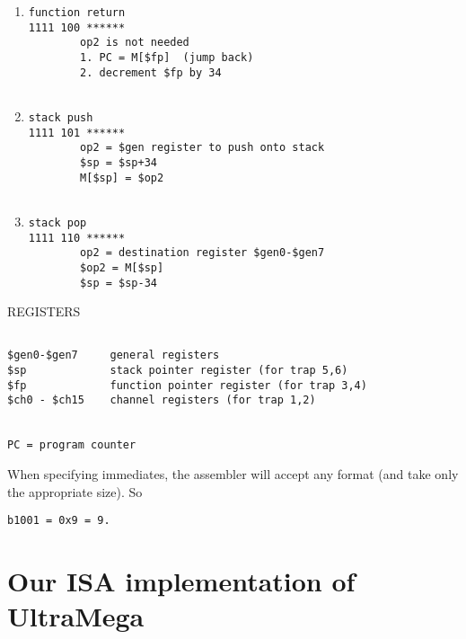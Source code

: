 \documentclass{article}
\begin{document}
\begin{enumerate}[resume]
\begin{enumerate}
\begin{verbatim}
\end{verbatim}
\item 
\begin{verbatim}
function return
1111 100 ******
        op2 is not needed
        1. PC = M[$fp]  (jump back)
        2. decrement $fp by 34


\end{verbatim}
\item 
\begin{verbatim}
stack push
1111 101 ******
        op2 = $gen register to push onto stack
        $sp = $sp+34
        M[$sp] = $op2
    
\end{verbatim}
\item 
\begin{verbatim}
stack pop
1111 110 ******
        op2 = destination register $gen0-$gen7
        $op2 = M[$sp]
        $sp = $sp-34
\end{verbatim}
\end{enumerate}
\end{enumerate}



REGISTERS
\begin{verbatim}

$gen0-$gen7     general registers
$sp             stack pointer register (for trap 5,6)
$fp             function pointer register (for trap 3,4)
$ch0 - $ch15    channel registers (for trap 1,2)


PC = program counter
\end{verbatim}

When specifying immediates, the assembler will accept any format (and take only the appropriate size).  So 
\begin{verbatim}
b1001 = 0x9 = 9.
\end{verbatim}


\section{Our ISA implementation of UltraMega}
\end{document}
